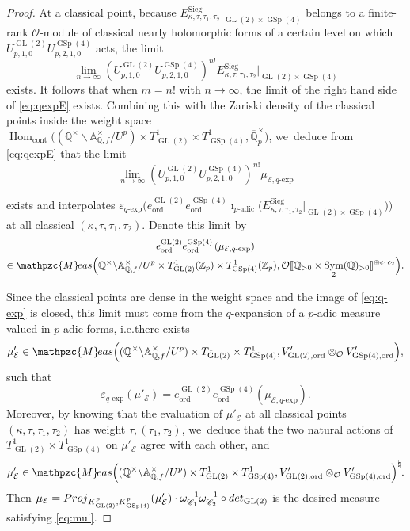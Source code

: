 \documentclass[10pt]{amsart}
\newcommand{\ie}{i.e.}
\theoremstyle{plain}
\theoremstyle{remark}
\let\mr\mathrm
\newcommand{\bA}{\mathbb{A}}
\newcommand{\bQ}{\mathbb{Q}}
\newcommand{\bZ}{\mathbb{Z}}
\newcommand{\cE}{\mathcal{E}}
\newcommand{\cO}{\mathcal{O}}
\newcommand{\sC}{\mathscr{C}}
\DeclareMathOperator{\GL}{GL}
\DeclareMathOperator{\GSp}{GSp}
\newcommand{\Meas}{\mathpzc{M}\mkern-2mu eas}
\newcommand{\cont}{\mathrm{cont}}
\newcommand{\ord}{\mathrm{ord}}
\newcommand{\Sieg}{\mr{Sieg}}
\DeclareMathOperator{\Hom}{Hom}
\DeclareMathOperator{\Sym}{Sym}
\newcommand{\adic}{\text{-}\mathrm{adic}}
\newcommand{\qexp}{q\text{-}\mathrm{exp}}
\let\ol\overline
\let\llb\llbracket
\let\rrb\rrbracket
\begin{document}
\begin{proof}
At a classical point, because $E^\Sieg_{\kappa,\tau,\tau_1,\tau_2}\big|_{\GL(2)\times\GSp(4)}$ belongs to a finite-rank $\cO$\nobreakdash-mod\-ule of classical nearly holomorphic forms of a certain level on which $U^{\GL(2)}_{p,1,0} U^{\GSp(4)}_{p,2,1,0}$ acts, the limit
\[
\lim_{n\to\infty} \left(U^{\GL(2)}_{p,1,0} U^{\GSp(4)}_{p,2,1,0}\right)^{n!} E^\Sieg_{\kappa,\tau,\tau_1,\tau_2}\big|_{\GL(2)\times\GSp(4)}
\]
exists. It follows that when $m=n!$ with $n\to\infty$, the limit of the right hand side of \eqref{eq:qexpE} exists. Combining this with the Zariski density of the classical points inside the weight space $\Hom_{\cont}\bigl((\bQ^\times\backslash\bA^\times_{\bQ,f}/U^p)\times T^1_{\GL(2)}\times T^1_{\GSp(4)},\ol{\bQ}^\times_p\bigr)$, we~deduce from \eqref{eq:qexpE} that the limit
\[
\lim_{n\to \infty}\left(U^{\GL(2)}_{p,1,0} U^{\GSp(4)}_{p,2,1,0}\right)^{n!} \mu_{\cE,\qexp}
\]
\begin{minipage}{\textwidth}
exists and interpolates $\varepsilon_{\qexp} \bigl(e^{\GL(2)}_\ord e^{\GSp(4)}_\ord\imath_{p\adic} \bigl(E^\Sieg_{\kappa,\tau,\tau_1,\tau_2}\big|_{\GL(2)\times\GSp(4)}\bigr)\bigr)$ at all classical $(\kappa,\tau,\tau_1,\tau_2)$. Denote this limit by
\begin{multline*}
e^{\GL(2)}_\ord e^{\GSp(4)}_\ord\left(\mu_{\cE,\qexp}\right)\\
\in\Meas\Bigl(\bQ^\times\backslash\bA^\times_{\bQ,f}/U^p\times T^1_{\GL(2)}(\bZ_p)\times T^1_{\GSp(4)}(\bZ_p),\cO\llb\bQ_{>0}\times \Sym_2(\bQ)_{> 0}\rrb^{\oplus c_1c_2}\Bigr).
\end{multline*}
\end{minipage}
Since the classical points are dense in the weight space and the image of \eqref{eq:q-exp} is closed, this limit must come from the $q$-expansion of a $p$-adic measure valued in $p$-adic forms, \ie there exists
\[
\mu'_\cE\in \Meas\Bigl((\bQ^\times\backslash\bA^\times_{\bQ,f}/U^p)\times T^1_{\GL(2)}\times T^1_{\GSp(4)},V'_{\GL(2),\ord}\otimes_\cO V'_{\GSp(4),\ord}\Bigr),
\]
such that
\[
\varepsilon_{\qexp}(\mu'_\cE)=e^{\GL(2)}_\ord e^{\GSp(4)}_\ord(\mu_{\cE,\qexp}).
\]
Moreover, by knowing that the evaluation of $\mu'_\cE$ at all classical points $(\kappa,\tau,\tau_1,\tau_2)$ has weight $\tau,(\tau_1,\tau_2)$, we~deduce that the two natural actions of $T^1_{\GL(2)}\times T^1_{\GSp(4)}$ on $\mu'_\cE$ agree with each other, and
\[
\mu'_\cE\in \Meas\Bigl((\bQ^\times\backslash\bA^\times_{\bQ,f}/U^p)\times T^1_{\GL(2)}\times T^1_{\GSp(4)},V'_{\GL(2),\ord}\otimes_\cO V'_{\GSp(4),\ord}\Bigr)^\natural.
\]
Then $\mu_\cE={\rm Proj}_{K^p_{\GL(2)},K^p_{\GSp(4)}}(\mu'_\cE)\cdot \omega^{-1}_{\sC_1}\omega^{-1}_{\sC_2}\circ{\rm det}_{\GL(2)}$ is the desired measure satisfying \eqref{eq:mu'}.
\end{proof}
\end{document}
